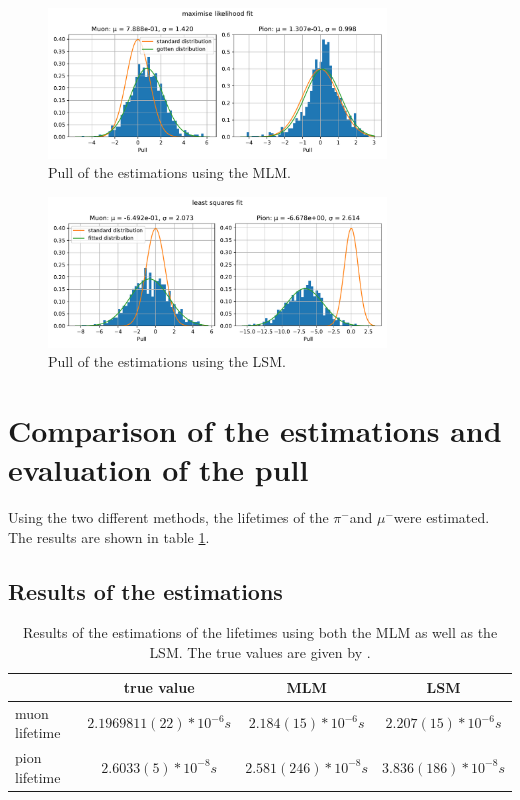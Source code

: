\documentclass[11pt, a4paper, oneside]{book}
\newcommand\Plotwidth{0.8}
\newcommand{\pion}{$\pi^{-}$}
\newcommand{\muon}{$\mu^{-}$}
\begin{document}
\begin{figure}[H]
  \centering
  \includegraphics[width=\Plotwidth\textwidth]{images/estimators_pull_likelihood.pdf}
  \caption{Pull of the estimations using the MLM.}
  \label{fig:pull_likelihood_method}
\end{figure}

\begin{figure}[H]
  \centering
  \includegraphics[width=\Plotwidth\textwidth]{images/estimators_pull_least_squares.pdf}
  \caption{Pull of the estimations using the LSM.}
  \label{fig:pull_least_squares_method}
\end{figure}

\section{Comparison of the estimations and evaluation of the pull}
Using the two different methods, the lifetimes of the \pion and \muon were estimated. The results are shown in table \ref{tab:results}.

\subsection{Results of the estimations}

\begin{table}[H]
  \begin{tabular}{l|ccc}
                & true value & MLM & LSM \\ \hline
  muon lifetime & $2.1969811(22)*10^{-6}\si{s}$ & $2.184(15)*10^{-6}\si{s}$ & $2.207(15)*10^{-6}\si{s}$ \\
  pion lifetime & $2.6033(5)*10^{-8}\si{s}$ & $2.581(246)*10^{-8}\si{s}$ & $3.836(186)*10^{-8}\si{s}$                    
  \end{tabular}
  \caption{Results of the estimations of the lifetimes using both the MLM as well as the LSM. The true values are given by \cite{ParticleDataGroup:2024cfk}.}
  \label{tab:results}
\end{table}
\end{document}
